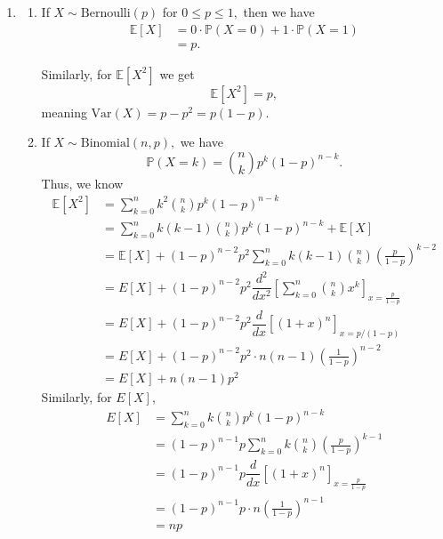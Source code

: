 \documentclass[12pt]{article}
\begin{document}
\begin{enumerate}
  \item
    \begin{enumerate}
      \item If $X \sim \text{Bernoulli}(p)$ for $0 \leq p \leq 1,$ then we have
        \begin{align*}
          \mathbb E[X] &= 0 \cdot \mathbb P(X = 0) + 1 \cdot \mathbb P(X = 1) \\
          &= p.
        \end{align*}

        Similarly, for $\mathbb E[X^2]$ we get
        $$
        \mathbb E[X^2] = p,
        $$
        meaning $\text{Var}(X) = p - p^2 = p(1-p).$

      \item If $X \sim \text{Binomial}(n, p),$ we have
        $$
        \mathbb P(X = k) = {n \choose k} p^{k} (1-p)^{n - k}.
        $$
        Thus, we know
        \begin{align*}
          \mathbb E[X^2] &= \sum_{k = 0}^{n} k^2 {n \choose k} p^k
          (1- p)^{n - k}  \\
          &= \sum_{k = 0}^{n} k(k-1) {n \choose k} p^k(1-p)^{n - k} +
          \mathbb E[X] \\
          &= \mathbb E[X] + (1-p)^{n - 2} p^2 \sum_{k = 0}^{n} k(k-1)
          {n \choose k} \left(\frac{p}{1-p}\right)^{k - 2} \\
          &= E[X] + (1-p)^{n - 2} p^2 \dfrac{d^2}{dx^2} \left[
            \sum_{k = 0}^{n} {n \choose k} x^k
          \right]_{x = \frac{p}{1-p}} \\
          &= E[X] + (1-p)^{n - 2}p^2 \dfrac{d}{dx}[\left(1 +
          x\right)^n]_{x = p/(1-p)} \\
          &= E[X] + (1-p)^{n-2} p^2 \cdot
          n(n-1)\left(\frac{1}{1-p}\right)^{n-2} \\
          &= E[X] + n(n-1)p^2
        \end{align*}
        Similarly, for $E[X]$,
        \begin{align*}
          E[X] &= \sum_{k = 0}^{n} k {n \choose k} p^k (1-p)^{n - k} \\
          &= (1-p)^{n-1} p \sum_{k = 0}^{n} k {n \choose k} \left(
            \frac{p}{1-p}
          \right)^{k-1} \\
          &= (1-p)^{n-1} p \dfrac{d}{dx}\left[
            (1 + x)^n
          \right]_{x = \frac{p}{1-p}} \\
          &= (1-p)^{n - 1} p \cdot n \left(\frac{1}{1-p}\right)^{n-1} \\
          &= np
        \end{align*}


\end{enumerate}
\end{enumerate}
\end{document}

